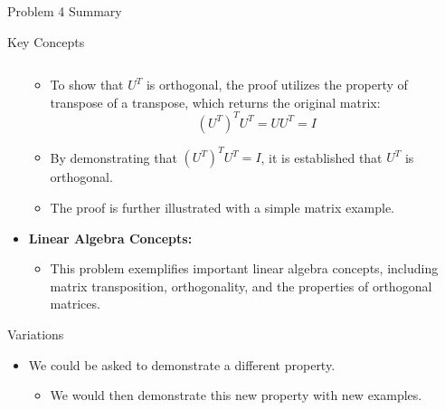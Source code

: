 \begin{summary}{Problem 4 Summary}
\begin{statement}{Key Concepts}
\begin{itemize}
\begin{itemize}
\begin{equation*}
                \end{equation*}
                \item To show that $U^T$ is orthogonal, the proof utilizes the property of transpose of a transpose, which returns the original matrix:
                \begin{equation*}
                    (U^T)^T U^T = UU^T = I
                \end{equation*}
                \item By demonstrating that $(U^T)^T U^T = I$, it is established that $U^T$ is orthogonal.
                \item The proof is further illustrated with a simple matrix example.
            \end{itemize}
            \item \textbf{Linear Algebra Concepts:}
            \begin{itemize}
                \item This problem exemplifies important linear algebra concepts, including matrix transposition, orthogonality, and the properties of orthogonal matrices.
            \end{itemize}
        \end{itemize}
    \end{statement}
    \begin{statement}{Variations}
        \begin{itemize}
            \item We could be asked to demonstrate a different property.
            \begin{itemize}
                \item We would then demonstrate this new property with new examples.
            \end{itemize}
        \end{itemize}
    \end{statement}
\end{summary}

